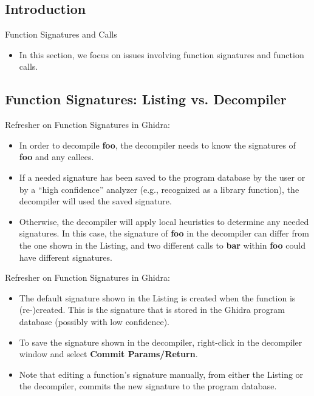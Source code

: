 \documentclass{beamer}
\begin{document}
\subsection{Introduction}
\begin{frame}
\begin{block}{Function Signatures and Calls}
\begin{itemize}
\item In this section, we focus on issues involving function signatures and function calls.
\end{itemize}
\end{block}
\end{frame}

\subsection{Function Signatures: Listing vs. Decompiler}
\begin{frame}
\begin{block}{Refresher on Function Signatures in Ghidra:}
\begin{itemize}
\item In order to decompile \textbf{foo}, the decompiler needs to know the signatures of \textbf{foo} and any callees.
\item If a needed signature has been saved to the program database by the user or by a ``high confidence'' analyzer (e.g., recognized as a library function), the
decompiler will used the saved signature. 
\item Otherwise, the decompiler will apply local heuristics to determine any needed signatures.  In this case, the signature of \textbf{foo} in the decompiler
can differ from the one shown in the Listing, and two different calls to \textbf{bar} within \textbf{foo} could have different signatures.   
\end{itemize}
\end{block}
\end{frame}

\begin{frame}
\begin{block}{Refresher on Function Signatures in Ghidra:}
\begin{itemize}
\item The default signature shown in the Listing is created when the function is (re-)created.  This is the signature that is stored in the Ghidra program database 
(possibly with low confidence).
\item To save the signature shown in the decompiler, right-click in the decompiler window and select \textbf{Commit Params/Return}. 
\item Note that editing a function's signature manually, from either the Listing or the decompiler, commits the new signature to the program database.
\end{itemize}
\end{block}
\end{frame}
\end{document}

